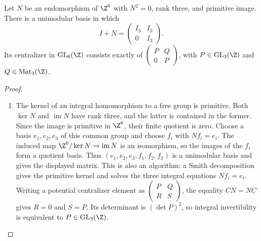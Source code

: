 \begin{theorem}\label{night:P1B.1}
Let $N$ be an endomorphism of $\Z^6$ with $N^2=0$, rank three,
and primitive image. There is a unimodular basis in which
\[
 I+N=\begin{pmatrix}I_3&I_3\\0&I_3\end{pmatrix}.
\]
Its centralizer in $\operatorname{GL}_6(\Z)$ consists exactly of
$\left(\begin{smallmatrix}P&Q\\0&P\end{smallmatrix}\right)$,
with $P\in\operatorname{GL}_3(\Z)$ and $Q\in\operatorname{Mat}_3(\Z)$.
\end{theorem}
\begin{proof}
\begin{enumerate}[label=\arabic*.]
\item The kernel of an integral homomorphism to a free group is
primitive. Both $\ker N$ and $\operatorname{im}N$ have rank three,
and the latter is contained in the former. Since the image is
primitive in $\Z^6$, their finite quotient is zero. Choose a basis
$e_1,e_2,e_3$ of this common group and choose $f_i$ with $Nf_i=e_i$.
The induced map $\Z^6/\ker N\to\operatorname{im}N$ is an
isomorphism, so the images of the $f_i$ form a quotient basis.
Thus $(e_1,e_2,e_3,f_1,f_2,f_3)$ is a unimodular basis and gives
the displayed matrix. This is also an algorithm: a Smith
decomposition gives the primitive kernel and solves the three
integral equations $Nf_i=e_i$.
Writing a potential centralizer element as
$\left(\begin{smallmatrix}P&Q\\R&S\end{smallmatrix}\right)$,
the equality $CN=NC$ gives $R=0$ and $S=P$.
Its determinant is $(\det P)^2$, so integral invertibility
is equivalent to $P\in\operatorname{GL}_3(\Z)$.

\end{enumerate}
\end{proof}




